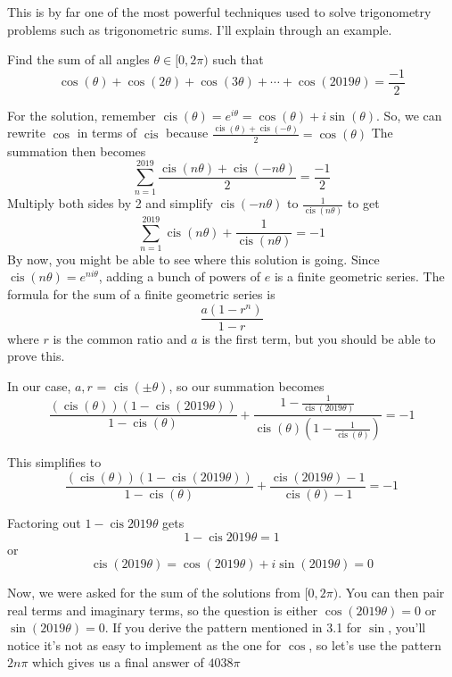 \documentclass[11pt]{scrartcl}
\DeclareMathOperator\cis{cis}
\begin{document}
This is by far one of the most powerful techniques used to solve trigonometry problems such as trigonometric sums. I'll explain through an example.
\begin{example}
\begin{problem}

Find the sum of all angles $\theta \in [0,2\pi)$ such that
$$\cos{(\theta)}+\cos{(2\theta)}+\cos{(3\theta)}+\cdots+\cos{(2019\theta)} = \frac{-1}{2}$$

For the solution, remember $\cis{(\theta)}=e^{i\theta}=\cos{(\theta)}+i\sin{(\theta)}$. So, we can rewrite $\cos$ in terms of $\cis$ because $\frac{\cis{(\theta)}+\cis{(-\theta)}}{2}=\cos{(\theta)}$
The summation then becomes $$\sum_{n=1}^{2019}{\frac{\cis{(n\theta)}+\cis{(-n\theta)}}{2} = \frac{-1}{2}}$$
Multiply both sides by 2 and simplify $\cis{(-n\theta)}$ to $\frac{1}{\cis{(n\theta)}}$ to get $$\sum_{n=1}^{2019}{\cis{(n\theta)}+\frac{1}{\cis{(n\theta)}}} = -1$$
By now, you might be able to see where this solution is going. Since $\cis{(n\theta)} = e^{ni\theta}$, adding a bunch of powers of $e$ is a finite geometric series. The formula for the sum of a finite geometric series is $$\frac{a(1-r^n)}{1-r}$$ where $r$ is the common ratio and $a$ is the first term, but you should be able to prove this.

\vspace{5mm}
In our case, $a,r$ = $\cis{(\pm\theta)}$, so our summation becomes $$\frac{(\cis{(\theta)})(1-\cis{(2019\theta)})}{1-\cis{(\theta)}}+\frac{1-\frac{1}{\cis{(2019\theta)}}}{\cis{(\theta)}(1-\frac{1}{\cis{(\theta)}})}=-1$$

This simplifies to $$\frac{(\cis{(\theta)})(1-\cis{(2019\theta)})}{1-\cis{(\theta)}}+\frac{\cis{(2019\theta)}-1}{\cis{(\theta)-1}}=-1$$

Factoring out $1-\cis{2019\theta}$ gets $$1-\cis{2019\theta}=1$$ or $$\cis{(2019\theta)}=\cos{(2019\theta)}+i\sin{(2019\theta)}=0$$

Now, we were asked for the sum of the solutions from $[0,2\pi)$. You can then pair real terms and imaginary terms, so the question is either $\cos(2019\theta)=0$ or $\sin(2019\theta)=0$. If you derive the pattern mentioned in 3.1 for $\sin$, you'll notice it's not as easy to implement as the one for $\cos$, so let's use the pattern $2n\pi$ which gives us a final answer of $\boxed{4038\pi}$
\end{problem}
\end{example}
\end{document}
